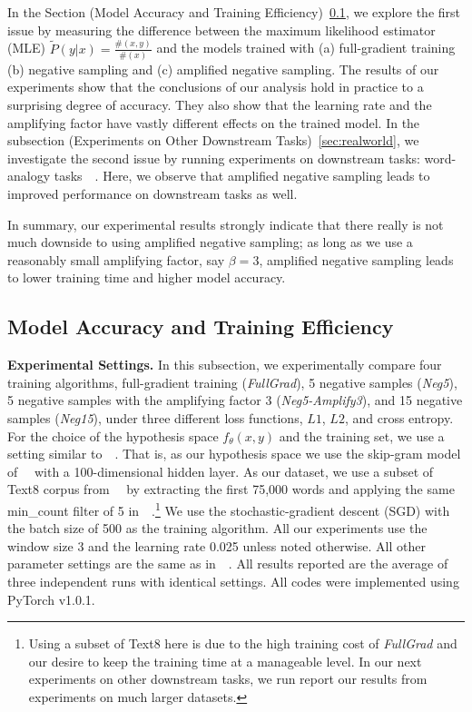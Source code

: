 In the Section (Model Accuracy and Training Efficiency)~\ref{sec:simulation}, we explore the first issue by measuring the difference between the maximum likelihood estimator (MLE) $\tilde{P}(y|x) = \frac{\#(x,y)}{\#(x)}$ and the models trained with (a) full-gradient training (b) negative sampling and (c) amplified negative sampling. The results of our experiments show that the conclusions of our analysis hold in practice to a surprising degree of accuracy. They also show that the learning rate and the amplifying factor have vastly different effects on the trained model. In the subsection (Experiments on Other Downstream Tasks)~\ref{sec:realworld}, we investigate the second issue by running experiments on  downstream tasks: word-analogy tasks~~\citep{mikolov2013efficient}. Here, we observe that amplified negative sampling leads to improved performance on  downstream tasks as well. 


In summary, our experimental results strongly indicate that there really is not much downside to using amplified negative sampling; as long as we use a reasonably small amplifying factor, say $\beta = 3$, amplified negative sampling leads to lower training time and higher model accuracy.

\subsection{Model Accuracy and Training Efficiency}\label{sec:simulation}

\textbf{Experimental Settings.} 
In this subsection, we experimentally compare four training algorithms, full-gradient training (\textit{FullGrad}), 5 negative samples (\textit{Neg5}), 5 negative samples with the amplifying factor 3 (\textit{Neg5-Amplify3}), and 15 negative samples (\textit{Neg15}),
under three different loss functions, $L1$, $L2$, and cross entropy. For the choice of the hypothesis space $f_{\theta}(x,y)$ and the training set, we use a setting similar to~~\citep{mikolov2013efficient}. That is, as our hypothesis space we use the skip-gram model of~~\citep{mikolov2013efficient} with a 100-dimensional hidden layer.
As our dataset, we use a subset of Text8 corpus from~~\citep{mikolov2013efficient} by extracting the first 75,000 words and applying the same min\_count filter of 5 in~~\citep{mikolov2013efficient}.\footnote{Using a subset of Text8 here is due to the high training cost of \textit{FullGrad} and our desire to keep the training time at a manageable level. In our next experiments on other downstream tasks, we run report our results from experiments on much larger datasets.} We use the stochastic-gradient descent (SGD) with the batch size of 500 as the training algorithm. All our experiments use the window size 3 and the learning rate 0.025 unless noted otherwise. All other parameter settings are the same as in~~\citep{mikolov2013efficient}. All results reported are the average of three independent runs with identical settings. All codes were implemented using PyTorch v1.0.1. 

